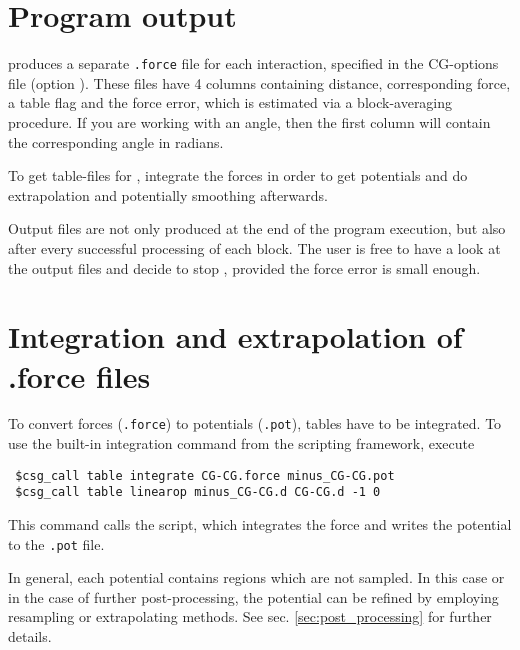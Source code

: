 \section{Program output}
 produces a separate \texttt{.force} file for each interaction, specified in the CG-options file (option ).
These files have 4 columns containing distance, corresponding force, a table flag and the force error, which is estimated via a block-averaging procedure.
If you are working with an angle, then the first column will contain the corresponding angle in radians.

To get table-files for \gromacs, integrate the forces in order to get potentials and do extrapolation and potentially smoothing afterwards.

Output files are not only produced at the end of the program execution, but also after every successful processing of each block. The user is free to have a look at the output files and decide to stop , provided the force error is small enough.

\section{Integration and extrapolation of .force files }
To convert forces (\texttt{.force}) to potentials (\texttt{.pot}), tables have to be integrated. To use the built-in integration command from the scripting framework, execute
\begin{verbatim}
 $csg_call table integrate CG-CG.force minus_CG-CG.pot
 $csg_call table linearop minus_CG-CG.d CG-CG.d -1 0
\end{verbatim}
This command calls the  script, which integrates the force and writes the potential to the \texttt{.pot} file.

In general, each potential contains regions which are not sampled. In this case or in the case of further post-processing, the potential can be refined by employing resampling or extrapolating methods. See sec. \ref{sec:post_processing} for further details.
